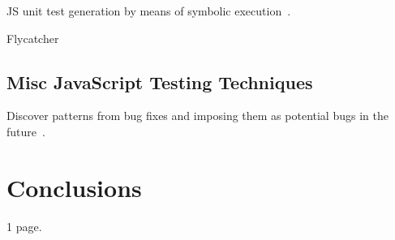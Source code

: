 \documentclass[sigconf,review, anonymous]{acmart}
\begin{document}
JS unit test generation by means of symbolic execution~\cite{tanida2014automatic}.

Flycatcher~\cite{deautomatic}

\subsection{Misc JavaScript Testing Techniques}
\label{sub.sec.misc.test.tech}

Discover patterns from bug fixes and imposing them as potential bugs in the future~\cite{quinn:fse16}. 

\section{Conclusions}
\label{sec:concl}
1 page.


 
\end{document}
